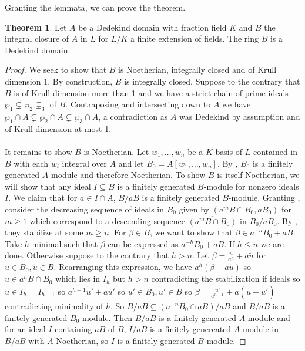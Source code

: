 \documentclass{amsart}
\theoremstyle{definition}
\newtheorem{theorem}{Theorem}[section]
\numberwithin{equation}{section}
\begin{document}
Granting the lemmata, we can prove the theorem. 
\begin{theorem}
  Let $A$ be a Dedekind domain with fraction field $K$ and $B$ the integral closure of $A$ in $L$ for $L/K$ a finite extension of fields. The ring $B$ is a Dedekind domain. 
\end{theorem}
\begin{proof}
  We seek to show that $B$ is Noetherian, integrally closed and of Krull dimension 1. By construction, $B$ is integrally closed. Suppose to the contrary that $B$ is of Krull dimension more than 1 and we have a strict chain of prime ideals $\wp_{1}\subsetneq\wp_{2}\subsetneq_{3}$ of $B$. Contraposing  and intersecting down to $A$ we have $\wp_{1}\cap A\subsetneq\wp_{2}\cap A\subsetneq\wp_{3}\cap A$, a contradiction as $A$ was Dedekind by assumption and of Krull dimension at most 1. \\\\
  It remains to show $B$ is Noetherian. Let $w_{1},\dots,w_{n}$ be a $K$-basis of $L$ contained in $B$ with each $w_{i}$ integral over $A$ and let $B_{0}=A[w_{1},\dots,w_{n}]$. By , $B_{0}$ is a finitely generated $A$-module and therefore Noetherian. To show $B$ is itself Noetherian, we will show that any ideal $I\subseteq B$ is a finitely generated $B$-module for nonzero ideals $I$. We claim that for $a\in I\cap A$, $B/aB$ is a finitely generated $B$-module. Granting , consider the decreasing sequence of ideals in $B_{0}$ given by $(a^{m}B\cap B_{0},aB_{0})$ for $m\geq 1$ which correspond to a descending sequence $\overline{(a^{m}B\cap B_{0})}$ in $B_{0}/aB_{0}$. By , they stabilize at some $m\geq n$. For $\beta\in B$, we want to show that $\beta\in a^{-n}B_{0}+aB$. Take $h$ minimal such that $\beta$ can be expressed as $a^{-h}B_{0}+aB$. If $h\leq n$ we are done. Otherwise suppose to the contrary that $h>n$. Let $\beta=\frac{u}{a^{h}}+a\widetilde{u}$ for $u\in B_{0},\widetilde{u}\in B$. Rearranging this expression, we have $a^{h}(\beta-a\widetilde{u})$ so $u\in a^{h}B\cap B_{0}$ which lies in $I_{h}$ but $h>n$ contradicting the stabilization if ideals so $u\in I_{h}=I_{h-1}$ so $a^{h-1}\widetilde{u'}+au'$ so $u'\in B_{0},\widetilde{u'}\in B$ so $\beta=\frac{u'}{a^{h-1}}+a(\widetilde{u}+\widetilde{u'})$ contradicting minimality of $h$. So $B/aB\subseteq(a^{-n}B_{0}\cap aB)/aB$ and $B/aB$ is a finitely generated $B_{0}$-module. Then $B/aB$ is a finitely generated $A$ module and for an ideal $I$ containing $aB$ of $B$, $I/aB$ is a finitely genereated $A$-module in $B/aB$ with $A$ Noetherian, so $I$ is a finitely generated $B$-module. 
\end{proof}
\newpage
\printbibliography
\end{document}
